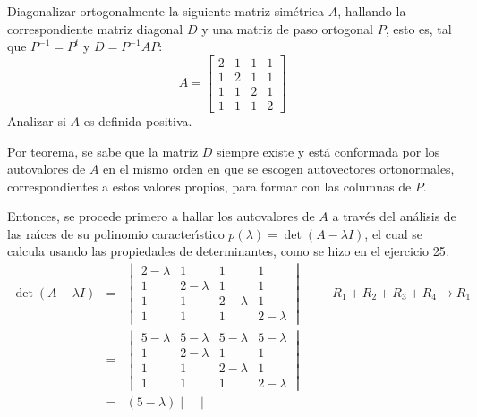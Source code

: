 \begin{enunciado}
 Diagonalizar ortogonalmente la siguiente matriz sim\'etrica $A$, hallando la correspondiente matriz diagonal $D$ y una matriz de paso ortogonal $P$, esto es, tal que $P^{-1} = P^t$ y $D=P^{-1}AP$:
 \begin{equation*}
  A = 
  \begin{bmatrix}
   2 & 1 & 1 & 1 \\
   1 & 2 & 1 & 1 \\
   1 & 1 & 2 & 1 \\
   1 & 1 & 1 & 2
  \end{bmatrix}
 \end{equation*}
 Analizar si $A$ es definida positiva.
\end{enunciado}

\begin{solucion}
 Por teorema, se sabe que la matriz $D$ siempre existe y est\'a conformada por los autovalores de $A$ en el mismo orden en que se escogen autovectores ortonormales, correspondientes a estos valores propios, para formar con las columnas de $P$.
 \par 
 Entonces, se procede primero a hallar los autovalores de $A$ a trav\'es del an\'alisis de las ra\'{\i}ces de su polinomio caracter\'{\i}stico $p(\lambda) = \det(A-\lambda I)$, el cual se calcula usando las propiedades de determinantes, como se hizo en el ejercicio 25.
 \begin{eqnarray*}
  \det(A - \lambda I) & = & 
  \begin{vmatrix}
   2 - \lambda & 1 & 1 & 1 \\
   1 & 2 - \lambda & 1 & 1 \\
   1 & 1 & 2 - \lambda & 1 \\
   1 & 1 & 1 & 2 - \lambda
  \end{vmatrix}
  \qquad
  \begin{matrix}
   R_1 + R_2 + R_3 + R_4 \to R_1 
  \end{matrix}
  \\
  & = & 
  \begin{vmatrix}
   5 - \lambda & 5 - \lambda & 5 - \lambda & 5 - \lambda \\
   1 & 2 - \lambda & 1 & 1 \\
   1 & 1 & 2 - \lambda & 1 \\
   1 & 1 & 1 & 2 - \lambda
  \end{vmatrix}
  \\
  &  = & 
  (5-\lambda )
  \begin{vmatrix}

\end{vmatrix}
\end{eqnarray*}
\end{solucion}
